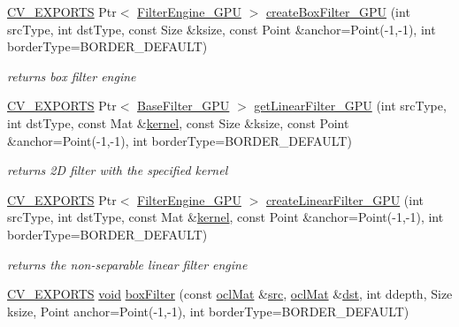 \begin{DoxyCompactItemize}
\hyperlink{core_2types__c_8h_a1bf9f0e121b54272da02379cfccd0a2b}{C\-V\-\_\-\-E\-X\-P\-O\-R\-T\-S} Ptr$<$ \hyperlink{classcv_1_1ocl_1_1FilterEngine__GPU}{Filter\-Engine\-\_\-\-G\-P\-U} $>$ \hyperlink{namespacecv_1_1ocl_ae0595ad5aa4d058188de180100e31247}{create\-Box\-Filter\-\_\-\-G\-P\-U} (int src\-Type, int dst\-Type, const Size \&ksize, const Point \&anchor=Point(-\/1,-\/1), int border\-Type=B\-O\-R\-D\-E\-R\-\_\-\-D\-E\-F\-A\-U\-L\-T)
\begin{DoxyCompactList}\small\item\em returns box filter engine \end{DoxyCompactList}\item 
\hyperlink{core_2types__c_8h_a1bf9f0e121b54272da02379cfccd0a2b}{C\-V\-\_\-\-E\-X\-P\-O\-R\-T\-S} Ptr$<$ \hyperlink{classcv_1_1ocl_1_1BaseFilter__GPU}{Base\-Filter\-\_\-\-G\-P\-U} $>$ \hyperlink{namespacecv_1_1ocl_ae5abd76196756e5ea018b1ee8e58b26a}{get\-Linear\-Filter\-\_\-\-G\-P\-U} (int src\-Type, int dst\-Type, const Mat \&\hyperlink{imgproc__c_8h_a863a75780ba6c5de552f5361cb0d2c89}{kernel}, const Size \&ksize, const Point \&anchor=Point(-\/1,-\/1), int border\-Type=B\-O\-R\-D\-E\-R\-\_\-\-D\-E\-F\-A\-U\-L\-T)
\begin{DoxyCompactList}\small\item\em returns 2\-D filter with the specified kernel \end{DoxyCompactList}\item 
\hyperlink{core_2types__c_8h_a1bf9f0e121b54272da02379cfccd0a2b}{C\-V\-\_\-\-E\-X\-P\-O\-R\-T\-S} Ptr$<$ \hyperlink{classcv_1_1ocl_1_1FilterEngine__GPU}{Filter\-Engine\-\_\-\-G\-P\-U} $>$ \hyperlink{namespacecv_1_1ocl_a0917c2fe8aa524c1007628da879049d4}{create\-Linear\-Filter\-\_\-\-G\-P\-U} (int src\-Type, int dst\-Type, const Mat \&\hyperlink{imgproc__c_8h_a863a75780ba6c5de552f5361cb0d2c89}{kernel}, const Point \&anchor=Point(-\/1,-\/1), int border\-Type=B\-O\-R\-D\-E\-R\-\_\-\-D\-E\-F\-A\-U\-L\-T)
\begin{DoxyCompactList}\small\item\em returns the non-\/separable linear filter engine \end{DoxyCompactList}\item 
\hyperlink{core_2types__c_8h_a1bf9f0e121b54272da02379cfccd0a2b}{C\-V\-\_\-\-E\-X\-P\-O\-R\-T\-S} \hyperlink{legacy_8hpp_a8bb47f092d473522721002c86c13b94e}{void} \hyperlink{namespacecv_1_1ocl_ac2af4e1942d697b9ffae93531d74af13}{box\-Filter} (const \hyperlink{classcv_1_1ocl_1_1oclMat}{ocl\-Mat} \&\hyperlink{legacy_8hpp_a371cd109b74033bc4366f584edd3dacc}{src}, \hyperlink{classcv_1_1ocl_1_1oclMat}{ocl\-Mat} \&\hyperlink{photo__c_8h_aed13e2a25279b24dc954073233fef7a5}{dst}, int ddepth, Size ksize, Point anchor=Point(-\/1,-\/1), int border\-Type=B\-O\-R\-D\-E\-R\-\_\-\-D\-E\-F\-A\-U\-L\-T)

\end{DoxyCompactItemize}
